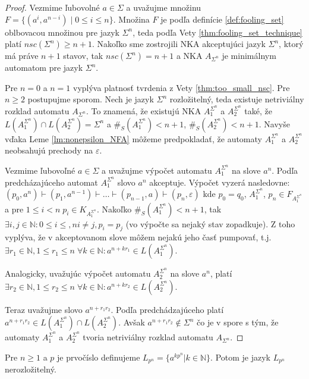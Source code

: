 \begin{proof}
Vezmime ľubovolné $ a \in \Sigma $ a uvažujme množinu $ F = \lbrace (a^i,a^{n-i}) \; | \; 0 \leq i \leq n \rbrace $. Množina $ F $ je podľa definície \ref{def:fooling_set} oblbovacou množinou pre jazyk $ \Sigma^n $, teda podľa Vety \ref{thm:fooling_set_technique} platí $ nsc(\Sigma^n) \geq n+1 $. Nakoľko sme zostrojili NKA akceptujúci jazyk $ \Sigma^n $, ktorý má práve $ n+1 $ stavov, tak $ nsc(\Sigma^n) = n+1 $ a NKA $ A_{\Sigma^n} $ je minimálnym automatom pre jazyk $ \Sigma^n $.
\par
Pre $ n=0 $ a $ n=1 $ vyplýva platnosť tvrdenia z Vety \ref{thm:too_small_nsc}. Pre $ n \geq 2 $ postupujme sporom. Nech je jazyk $ \Sigma^n$ rozložitelný, teda existuje netriviálny rozklad automatu $ A_{\Sigma^n} $. To znamená, že existujú NKA $ A_1^{\Sigma^n} $ a $ A_2^{\Sigma^n} $ také, že $ L(A_1^{\Sigma^n}) \cap L(A_2^{\Sigma^n}) = \Sigma^n $ a $ \#_S(A_1^{\Sigma^n}) < n+1 $, $ \#_S(A_2^{\Sigma^n}) < n+1 $. Navyše vďaka Leme \ref{lm:nonepsilon_NFA} môžeme predpokladať, že automaty $ A_1^{\Sigma^n} $ a $ A_2^{\Sigma^n} $ neobsahujú prechody na $ \varepsilon $. 
\par
Vezmime ľubovoľné $ a \in \Sigma $ a uvažujme výpočet automatu $ A_1^{\Sigma^n} $ na slove $ a^n $. Podľa predcházajúceho automat $ A_1^{\Sigma^n} $ slovo $ a^n $ akceptuje. Výpočet vyzerá nasledovne: $ (p_0,a^n) \vdash (p_1, a^{n-1}) \vdash \ldots \vdash (p_{n-1}, a) \vdash (p_n, \varepsilon) $ kde $ p_0 = q_0$, $ A_1^{\Sigma^n} $, $ p_n \in F_{A_1^{\Sigma^n}} $ a pre $ 1 \leq i < n \; p_i \in K_{A_1^{\Sigma^n}}$. Nakoľko $ \#_S(A_1^{\Sigma^n}) < n+1 $, tak $ \exists i,j \in \mathbb{N}: 0 \leq i \leq, n i \neq j, p_i=p_j $ (vo výpočte sa nejaký stav zopadkuje). Z toho vyplýva, že v akceptovanom slove môžem nejakú jeho časť pumpovať, t.j. $ \exists r_1 \in \mathbb{N}, 1 \leq r_1 \leq n \; \forall k \in \mathbb{N}: a^{n + kr_1} \in L(A_1^{\Sigma^n}) $.
\par
Analogicky, uvažujúc výpočet automatu $ A_2^{\Sigma^n} $ na slove $ a^n $, platí $ \exists r_2 \in \mathbb{N}, 1 \leq r_2 \leq n \; \forall k \in \mathbb{N}: a^{n + kr_2} \in L(A_2^{\Sigma^n}) $.
\par
Teraz uvažujme slovo $ a^{n+r_1r_2} $. Podľa predchádzajúceho platí $ a^{n+r_1r_2} \in L(A_1^{\Sigma^n}) \cap L(A_2^{\Sigma^n}) $. Avšak $ a^{n+r_1r_2} \notin \Sigma^n $ čo je v spore s tým, že automaty $ A_1^{\Sigma^n} $ a $ A_2^{\Sigma^n} $ tvoria netriviálny rozklad automatu $ A_{\Sigma^n} $.
\end{proof}

\begin{theorem}
\label{thm:prime^n}
Pre $ n \geq 1 $ a $ p $ je prvočíslo definujeme $ L_{p^n} = \lbrace a^{kp^{n}} | k \in \mathbb{N} \rbrace $. Potom je jazyk $ L_{p^n} $ nerozložitelný.
\end{theorem}

